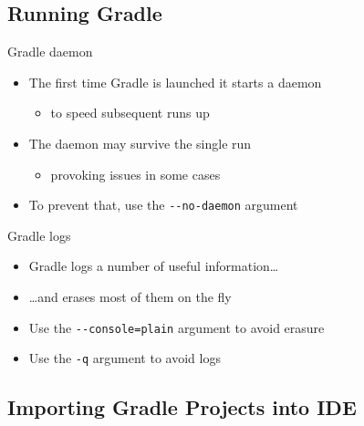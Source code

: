 \documentclass[presentation]{beamer}\mode<presentation>{\usetheme{AMSBolognaFC}}
\begin{document}
\subsection{Running Gradle}

\begin{frame}

    \begin{block}{Gradle daemon}
        \begin{itemize}
            \item The first time Gradle is launched it starts a daemon
            \begin{itemize}
                \item to speed subsequent runs up
            \end{itemize}
            \item The daemon may survive the single run
            \begin{itemize}
                \item provoking issues in some cases
            \end{itemize}
            \item To prevent that, use the \alert{\texttt{{-}-no-daemon}} argument
        \end{itemize}
    \end{block}

    \begin{block}{Gradle logs}
        \begin{itemize}
            \item Gradle logs a number of useful information\ldots
            \item \ldots and erases most of them on the fly
            \item Use the \alert{\texttt{{-}-console=plain}} argument to avoid erasure
            \item Use the \alert{\texttt{-q}} argument to avoid logs
        \end{itemize}
    \end{block}
\end{frame}

\subsection{Importing Gradle Projects into IDE}
\end{document}
